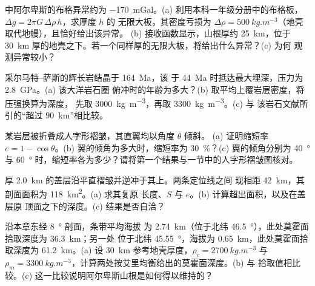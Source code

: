 \begin{exercise}[$\star\star$]\label{exo:b2:alpine-orogen:5}
中阿尔卑斯的布格异常约为 \qty{-170}{mGal}。(a) 利用本科一年级分册中的布格板，
$\Delta g = 2\pi G\,\Delta\rho\,h$，求厚度 $h$ 的
无限大板，其密度亏损为 $\Delta\rho = \qty{500}{kg.m^{-3}}$（地壳取代地幔），且恰好给出该异常。
(b) 接收函数显示，山根厚约 \qty{25}{km}，位于
\qty{30}{km} 厚的地壳之下。若一个同样厚的无限大板，将给出什么异常？(c) 为何
观测异常较小？
\end{exercise}

\begin{exercise}[$\star\star$]\label{exo:b2:alpine-orogen:6}
采尔马特–萨斯的辉长岩结晶于 \qty{164}{Ma}，该
于 \qty{44}{Ma} 时抵达最大埋深，压力为 \qty{2.8}{GPa}。(a) 该大洋岩石圈
俯冲时的年龄为多大？(b) 取平均上覆岩层密度，将压强换算为深度，
先取 \qty{3000}{kg.m^{-3}}，再取 \qty{3300}{kg.m^{-3}}。(c) 与
该岩石文献所引的“超过 \qty{90}{km}”相比较。
\end{exercise}

\begin{exercise}[$\star\star$]\label{exo:b2:alpine-orogen:7}
某岩层被折叠成人字形褶皱，其直翼均以角度 $\theta$ 倾斜。
(a) 证明缩短率 $e = 1 - \cos\theta$。(b) 翼的倾角为多大时，缩短率为
\qty{30}{\percent}？(c) 翼的倾角分别为 \qty{40}{\degree} 与
\qty{60}{\degree} 时，缩短率各为多少？请将第一个结果与一节中的人字形褶皱图核对。
\end{exercise}

\begin{exercise}[$\star\star$]\label{exo:b2:alpine-orogen:8}
厚 \qty{2.0}{km} 的盖层沿平直褶皱并逆冲于其上。两条定位线之间
现相距 \qty{42}{km}，其剖面面积为 \qty{118}{km^2}。(a) 求其复原
长度、$S$ 与 $e$。(b) 计算超出面积，以及在盖层原
顶面之下的深度。(c) 结果是否自洽？
\end{exercise}

\begin{exercise}[$\star\star$]\label{exo:b2:alpine-orogen:9}
沿本章东经 \qty{8}{\degree} 剖面，条带平均海拔
为 \qty{2.74}{km}（位于北纬 \qty{46.5}{\degree}），此处莫霍面拾取深度为 \qty{36.3}{km}；另一处
位于北纬 \qty{45.55}{\degree}，海拔为 \qty{0.65}{km}，此处莫霍面拾取深度为 \qty{61.2}{km}。(a) 设
\qty{30}{km} 参考地壳厚度，$\rho_c = \qty{2700}{kg.m^{-3}}$ 与 $\rho_m =
\qty{3300}{kg.m^{-3}}$，计算两处按艾里均衡给出的莫霍面深度。(b) 与
拾取值相比较。(c) 这一比较说明阿尔卑斯山根是如何得以维持的？
\end{exercise}


